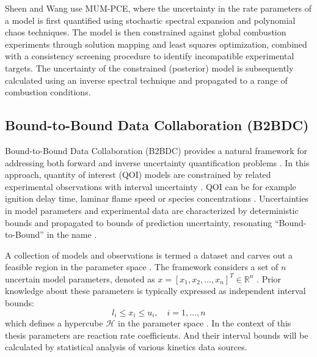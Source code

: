 Sheen and Wang \cite{sheen_method_2011} use MUM-PCE, where the uncertainty in the rate parameters of a model is first quantified using stochastic spectral expansion and polynomial chaos techniques. The model is then constrained against global combustion experiments through solution mapping and least squares optimization, combined with a consistency screening procedure to identify incompatible experimental targets. The uncertainty of the constrained (posterior) model is subsequently calculated using an inverse spectral technique and propagated to a range of combustion conditions. \cite{sheen_method_2011} 


\subsection{Bound-to-Bound Data Collaboration (B2BDC)}

Bound-to-Bound Data Collaboration (B2BDC) provides a natural framework for addressing both forward and inverse uncertainty quantification problems \cite{hegde_consistency_2018}. In this approach, quantity of interest (QOI) models are constrained by related experimental observations with interval uncertainty \cite{hegde_consistency_2018}. QOI can be for example ignition delay time, laminar flame speed or species concentrations . Uncertainties in model parameters and experimental data are characterized by deterministic bounds and propagated to bounds of prediction uncertainty, resonating ``Bound-to-Bound'' in the name \cite{li_development_nodate}.

A collection of models and observations is termed a dataset and carves out a feasible region in the parameter space \cite{hegde_consistency_2018}. The framework considers a set of $n$ uncertain model parameters, denoted as $x = [x_1, x_2, \dots, x_n]^T \in \mathbb{R}^n$ \cite{li_development_nodate}. Prior knowledge about these parameters is typically expressed as independent interval bounds:
\begin{equation}
	l_i \le x_i \le u_i, \quad i = 1, \dots, n
\end{equation}
\cite{li_development_nodate} which defines a hypercube $\mathcal{H}$ in the parameter space \cite{li_development_nodate}. In the context of this thesis parameters are reaction rate coefficients. And their interval bounds will be calculated by statistical analysis of various kinetics data sources. 

